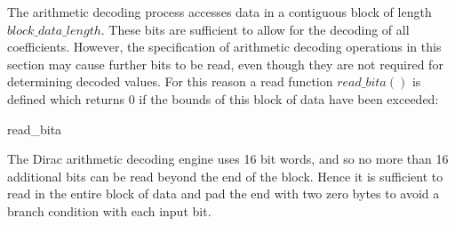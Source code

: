 The arithmetic decoding process accesses data in a contiguous block of
length $block\_data\_length$. These bits are sufficient to allow for the
decoding of all coefficients. However, the specification of arithmetic
decoding operations in this section may cause further bits to be read,
even though they are not required for determining decoded values. For this
reason a read function $read\_bita()$ is defined which returns $0$ if the
bounds of this block of data have been exceeded:

\begin{pseudo}{read\_bita}{}
\bsELSE
{}
\bsEND
\end{pseudo}

\begin{informative}
The Dirac arithmetic decoding engine uses 16 bit words, and so no more than 16
additional bits can be read beyond the end of the block. Hence it is sufficient
to read in the entire block of data and pad the end with two zero bytes to
avoid a branch condition with each input bit.
\end{informative}

